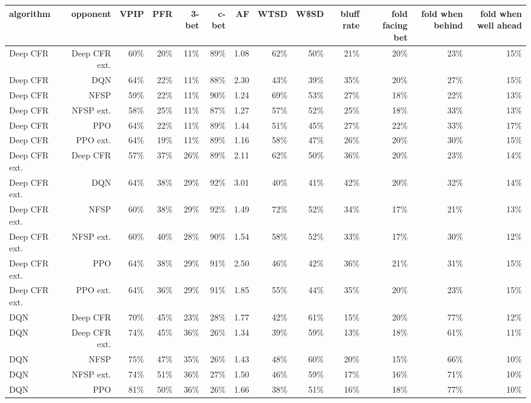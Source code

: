 \begin{tabular}{lrrrrrrrrrrrr}
\toprule
algorithm & opponent & VPIP & PFR & 3-bet & c-bet & AF & WTSD & W\$SD & bluff rate & fold facing bet & fold when behind & fold when well ahead \\
\midrule
Deep CFR & Deep CFR ext. & 60\% & 20\% & 11\% & 89\% & 1.08 & 62\% & 50\% & 21\% & 20\% & 23\% & 15\% \\
Deep CFR & DQN & 64\% & 22\% & 11\% & 88\% & 2.30 & 43\% & 39\% & 35\% & 20\% & 27\% & 15\% \\
Deep CFR & NFSP & 59\% & 22\% & 11\% & 90\% & 1.24 & 69\% & 53\% & 27\% & 18\% & 22\% & 13\% \\
Deep CFR & NFSP ext. & 58\% & 25\% & 11\% & 87\% & 1.27 & 57\% & 52\% & 25\% & 18\% & 33\% & 13\% \\
Deep CFR & PPO & 64\% & 22\% & 11\% & 89\% & 1.44 & 51\% & 45\% & 27\% & 22\% & 33\% & 17\% \\
Deep CFR & PPO ext. & 64\% & 19\% & 11\% & 89\% & 1.16 & 58\% & 47\% & 26\% & 20\% & 30\% & 15\% \\
Deep CFR ext. & Deep CFR & 57\% & 37\% & 26\% & 89\% & 2.11 & 62\% & 50\% & 36\% & 20\% & 23\% & 14\% \\
Deep CFR ext. & DQN & 64\% & 38\% & 29\% & 92\% & 3.01 & 40\% & 41\% & 42\% & 20\% & 32\% & 14\% \\
Deep CFR ext. & NFSP & 60\% & 38\% & 29\% & 92\% & 1.49 & 72\% & 52\% & 34\% & 17\% & 21\% & 13\% \\
Deep CFR ext. & NFSP ext. & 60\% & 40\% & 28\% & 90\% & 1.54 & 58\% & 52\% & 33\% & 17\% & 30\% & 12\% \\
Deep CFR ext. & PPO & 64\% & 38\% & 29\% & 91\% & 2.50 & 46\% & 42\% & 36\% & 21\% & 31\% & 15\% \\
Deep CFR ext. & PPO ext. & 64\% & 36\% & 29\% & 91\% & 1.85 & 55\% & 44\% & 35\% & 20\% & 23\% & 15\% \\
DQN & Deep CFR & 70\% & 45\% & 23\% & 28\% & 1.77 & 42\% & 61\% & 15\% & 20\% & 77\% & 12\% \\
DQN & Deep CFR ext. & 74\% & 45\% & 36\% & 26\% & 1.34 & 39\% & 59\% & 13\% & 18\% & 61\% & 11\% \\
DQN & NFSP & 75\% & 47\% & 35\% & 26\% & 1.43 & 48\% & 60\% & 20\% & 15\% & 66\% & 10\% \\
DQN & NFSP ext. & 74\% & 51\% & 36\% & 27\% & 1.50 & 46\% & 59\% & 17\% & 16\% & 71\% & 10\% \\
DQN & PPO & 81\% & 50\% & 36\% & 26\% & 1.66 & 38\% & 51\% & 16\% & 18\% & 77\% & 10\% \\

\end{tabular}
